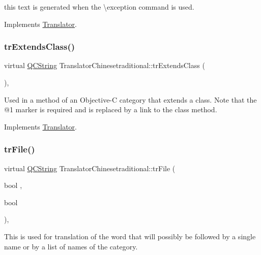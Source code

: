 this text is generated when the \textbackslash{}exception command is used. 

Implements \mbox{\hyperlink{class_translator}{Translator}}.

\mbox{\label{class_translator_chinesetraditional_a3b5605dd807ddb103e8cdeb8af243185}} 
\subsubsection{\texorpdfstring{trExtendsClass()}{trExtendsClass()}}
{\footnotesize\ttfamily virtual \mbox{\hyperlink{class_q_c_string}{Q\+C\+String}} Translator\+Chinesetraditional\+::tr\+Extends\+Class (\begin{DoxyParamCaption}{ }\end{DoxyParamCaption})\hspace{0.3cm}{\ttfamily [inline]}, {\ttfamily [virtual]}}

Used in a method of an Objective-\/C category that extends a class. Note that the @1 marker is required and is replaced by a link to the class method. 

Implements \mbox{\hyperlink{class_translator}{Translator}}.

\mbox{\label{class_translator_chinesetraditional_abcdea164b370eb28a76e76393000ae7b}} 
\subsubsection{\texorpdfstring{trFile()}{trFile()}}
{\footnotesize\ttfamily virtual \mbox{\hyperlink{class_q_c_string}{Q\+C\+String}} Translator\+Chinesetraditional\+::tr\+File (\begin{DoxyParamCaption}\item[{bool}]{,  }\item[{bool}]{ }\end{DoxyParamCaption})\hspace{0.3cm}{\ttfamily [inline]}, {\ttfamily [virtual]}}

This is used for translation of the word that will possibly be followed by a single name or by a list of names of the category. 

